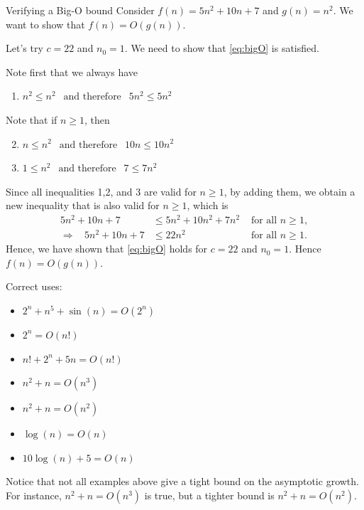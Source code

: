 \begin{example}{Verifying a Big-O bound}{}
\label{ex:bigO}
Consider $f(n) = 5 n^2 + 10n + 7$ and $g(n) = n^2$.  We want to show that $f(n) = O(g(n))$.  

Let's try $c = 22$ and $n_0 = 1$.  We need to show that \autoref{eq:bigO} is satisfied.

Note first that we always have
\begin{enumerate}
\item $n^2 \leq n^2 \ \ \text{ and therefore } \ \ 5n^2 \leq 5n^2$
\end{enumerate}
Note that if $n \geq 1$, then 
\begin{enumerate}
\setcounter{enumi}{1}
\item $n \leq n^2 \ \ \text{ and therefore } \ \ 10n \leq 10 n^2$
\item $1 \leq n^2 \ \ \text{ and therefore } \ \  7 \leq 7 n^2$
\end{enumerate}
Since all inequalities 1,2, and 3 are valid for $n\geq 1$, by adding them, we obtain a new inequality that is also valid for $n \geq 1$, which is
\begin{align}
5n^2 + 10n + 7 &\leq 5n^2 + 10n^2 + 7 n^2 & \text{ for all } n \geq 1,\\
\Rightarrow \ \ \ \  5n^2 + 10n + 7  & \leq 22 n^2 & \text{ for all } n \geq 1.
\end{align}
Hence, we have shown that \autoref{eq:bigO} holds for $c = 22$ and $n_0 = 1$.  Hence $f(n) = O(g(n))$.
\end{example}

Correct uses:
\begin{itemize}
\item $2^n + n^5 + \sin(n) = O(2^n)$
\item $2^n = O(n!)$
\item $n! + 2^n + 5n = O(n!)$
\item $n^2 + n = O(n^3)$
\item $n^2 + n = O(n^2)$
\item $\log(n) = O(n)$
\item $10 \log(n) + 5 = O(n)$
\end{itemize}
Notice that not all examples above give a tight bound on the asymptotic growth.  For instance, $n^2 + n = O(n^3)$ is true, but a tighter bound is $n^2 + n = O(n^2)$.  


